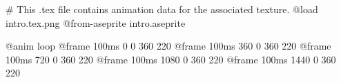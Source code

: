 # This .tex file contains animation data for the associated texture.
@load intro.tex.png
@from-aseprite intro.aseprite

@anim loop
	@frame 100ms 0 0 360 220
	@frame 100ms 360 0 360 220
	@frame 100ms 720 0 360 220
	@frame 100ms 1080 0 360 220
	@frame 100ms 1440 0 360 220
